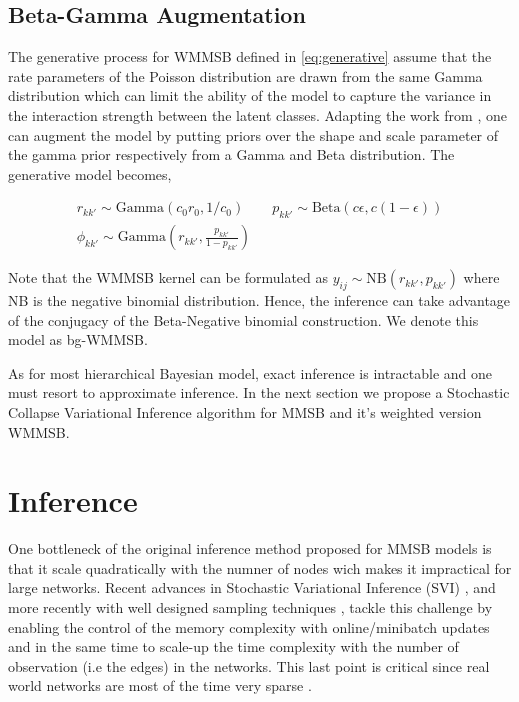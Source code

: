 \subsection{Beta-Gamma Augmentation}

The generative process for WMMSB defined in \eqref{eq:generative} assume that the rate parameters of the Poisson distribution are drawn from the same Gamma distribution which can limit the ability of the model to capture the variance in the interaction strength between the latent classes. Adapting the work from \cite{zhou2015negative} \cite{zhou2012beta}, one can augment the model by putting priors over the shape and scale parameter of the gamma prior respectively from a Gamma and Beta distribution. The generative model becomes,

\begin{gather*}
r_{kk'} \sim \textrm{Gamma}(c_0r_0, 1/c_0) \qquad p_{kk'} \sim \textrm{Beta}(c\epsilon, c(1-\epsilon)) \\
\phi_{kk'} \sim \textrm{Gamma}(r_{kk'}, \frac{p_{kk'}}{1-p_{kk'}})
\end{gather*}

Note that the WMMSB kernel can be formulated as $y_{ij} \sim \textrm{NB}(r_{kk'}, p_{kk'})$ where NB is the negative binomial distribution. Hence, the inference can take advantage of the conjugacy of the Beta-Negative binomial construction. We denote this model as bg-WMMSB.

As for most hierarchical Bayesian model, exact inference is intractable and one must resort to approximate inference. In the next section we propose a Stochastic Collapse Variational Inference algorithm for MMSB and it's weighted version WMMSB.


\section{Inference}

One bottleneck of the original inference method proposed for MMSB models is that it scale quadratically with the numner of nodes wich makes it impractical for large networks. Recent advances in Stochastic Variational Inference (SVI) \cite{hoffman2013stochastic},  and more recently with well designed sampling techniques \cite{gopalan2013efficient}\cite{kim2013efficient}, tackle this challenge by enabling the control of the memory complexity with online/minibatch updates and in the same time to scale-up the time complexity with the number of observation (i.e the edges) in the networks. This last point is critical since real world networks are most of the time very sparse \cite{barabasi_burst}. 


